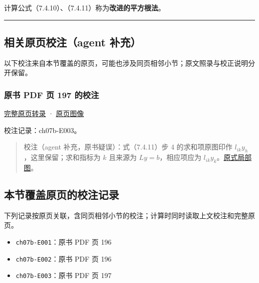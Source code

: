 \documentclass[
  10pt,
  fontset=fandol]{ctexart}
\providecommand{\tightlist}{%
  \setlength{\itemsep}{0pt}\setlength{\parskip}{0pt}}
\begin{document}
计算公式（7.4.10）、（7.4.11）称为\textbf{改进的平方根法}。

\begin{center}\rule{0.5\linewidth}{0.5pt}\end{center}

\subsection{相关原页校注（agent 补充）}\label{ux76f8ux5173ux539fux9875ux6821ux6ce8agent-ux8865ux5145}

以下校注来自本节覆盖的原页，可能也涉及同页相邻小节；原文照录与校正说明分开保留。

\subsubsection{原书 PDF 页 197 的校注}\label{ux539fux4e66-pdf-ux9875-197-ux7684ux6821ux6ce8}

\href{../pages/pdf-197.md}{完整原页转录} · \href{../../source-images/pdf-197.jpeg}{原页图像}

校注记录：ch07b-E003。

\begin{quote}
校注（agent 补充，原书疑误）：式（7.4.11）步 4 的求和项原图印作 \(l_{ik}y_h\)，这里保留；求和指标为 \(k\) 且来源为 \(Ly=b\)，相应项应为 \(l_{ik}y_k\)。\href{../assets/ch07b/197-solves.png}{原式局部图}。
\end{quote}

\subsection{本节覆盖原页的校注记录}\label{ux672cux8282ux8986ux76d6ux539fux9875ux7684ux6821ux6ce8ux8bb0ux5f55}

下列记录按原页关联，含同页相邻小节的校注；计算时同时读取上文校注和完整原页。

\begin{itemize}
\tightlist
\item
  \texttt{ch07b-E001}：原书 PDF 页 196
\item
  \texttt{ch07b-E002}：原书 PDF 页 196
\item
  \texttt{ch07b-E003}：原书 PDF 页 197
\end{itemize}
\end{document}
